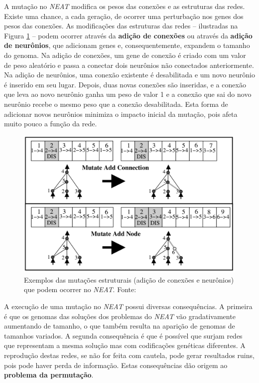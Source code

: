 A mutação no \textit{NEAT} modifica os pesos das conexões e as estruturas das
redes. Existe uma chance, a cada geração, de ocorrer uma perturbação nos genes
dos pesos das conexões. As modificações das estruturas das redes -- ilustradas
na Figura \ref{fig:neat-structural-mutation} -- podem ocorrer através da
\textbf{adição de conexões} ou através da \textbf{adição de neurônios}, que
adicionam genes e, consequentemente, expandem o tamanho do genoma. Na adição de
conexões, um gene de conexão é criado com um valor de peso aleatório e passa a
conectar dois neurônios não conectados anteriormente. Na adição de neurônios,
uma conexão existente é desabilitada e um novo neurônio é inserido em seu lugar.
Depois, duas novas conexões são inseridas, e a conexão que leva ao novo neurônio
ganha um peso de valor 1 e a conexão que sai do novo neurônio recebe o mesmo
peso que a conexão desabilitada. Esta forma de adicionar novos neurônios
minimiza o impacto inicial da mutação, pois afeta muito pouco a função da rede.

\begin{figure}[H]
\centering
\includegraphics[width=\textwidth]{fig/neat-mutation-examples.pdf}
\caption{Exemplos das mutações estruturais (adição de conexões e neurônios) que
podem ocorrer no \textit{NEAT}. Fonte: \cite{stanley:ec02}}
\label{fig:neat-structural-mutation}
\end{figure}

A execução de uma mutação no \textit{NEAT} possui diversas consequências. A
primeira é que os genomas das soluções dos problemas do \textit{NEAT} vão
gradativamente aumentando de tamanho, o que também resulta na aparição de
genomas de tamanhos variados. A segunda consequência é que é possível que surjam
redes que representam a mesma solução mas com codificações genéticas diferentes.
A reprodução destas redes, se não for feita com cautela, pode gerar resultados
ruins, pois pode haver perda de informação. Estas consequências dão origem ao
\textbf{problema da permutação}.


